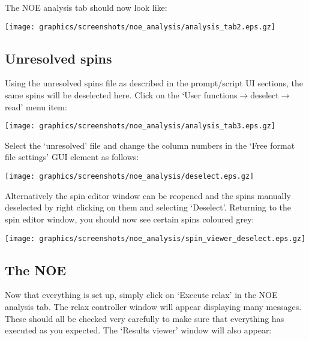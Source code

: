 The NOE analysis tab should now look like:

\begin{minipage}[h]{\linewidth}
\centerline{\texttt{[image: graphics/screenshots/noe\_analysis/analysis\_tab2.eps.gz]}}
\end{minipage}



\subsection{Unresolved spins}

Using the unresolved spins file as described in the prompt/script UI sections, the same spins will be deselected here.  Click on the `User functions$\to$deselect$\to$read' menu item:

\begin{minipage}[h]{\linewidth}
\centerline{\texttt{[image: graphics/screenshots/noe\_analysis/analysis\_tab3.eps.gz]}}
\end{minipage}

Select the `unresolved' file and change the column numbers in the `Free format file settings' GUI element as follows: 

\begin{minipage}[h]{\linewidth}
\centerline{\texttt{[image: graphics/screenshots/noe\_analysis/deselect.eps.gz]}}
\end{minipage}

Alternatively the spin editor window can be reopened and the spins manually deselected by right clicking on them and selecting `Deselect'.  Returning to the spin editor window, you should now see certain spins coloured grey:

\begin{minipage}[h]{\linewidth}
\centerline{\texttt{[image: graphics/screenshots/noe\_analysis/spin\_viewer\_deselect.eps.gz]}}
\end{minipage}



\subsection{The NOE}

Now that everything is set up, simply click on `Execute relax' in the NOE analysis tab.  The relax controller window will appear displaying many messages.  These should all be checked very carefully to make sure that everything has executed as you expected.  The `Results viewer' window will also appear:

